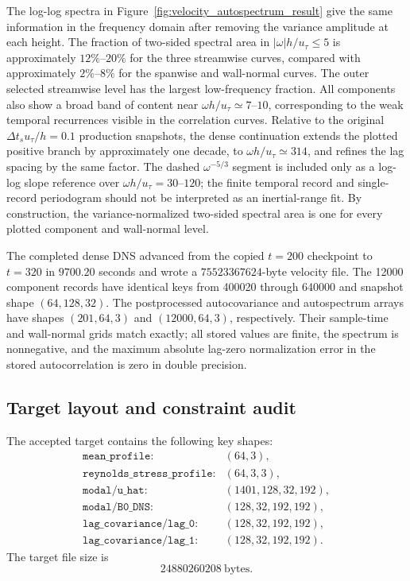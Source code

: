 \documentclass[11pt]{article}
\begin{document}
The log-log spectra in Figure~\ref{fig:velocity_autospectrum_result} give the
same information in the frequency domain after removing the variance amplitude
at each height. The fraction of two-sided spectral area in
\(|\omega|h/u_{\tau}\le5\) is approximately \(12\%\)--\(20\%\) for the three
streamwise curves, compared with approximately \(2\%\)--\(8\%\) for the
spanwise and wall-normal curves. The outer selected streamwise level has the
largest low-frequency fraction. All components also show a broad band of
content near \(\omega h/u_{\tau}\simeq7\)--\(10\), corresponding to the weak
temporal recurrences visible in the correlation curves. Relative to the
original \(\Delta t_s u_\tau/h=0.1\) production snapshots, the dense
continuation extends the plotted positive branch by approximately one decade,
to \(\omega h/u_\tau\simeq314\), and refines the lag spacing by the same
factor. The dashed \(\omega^{-5/3}\) segment is included only as a log-log
slope reference over \(\omega h/u_\tau=30\)--\(120\); the finite temporal
record and single-record periodogram should not be interpreted as an
inertial-range fit. By construction, the variance-normalized two-sided
spectral area is one for every plotted component and wall-normal level.

The completed dense DNS advanced from the copied \(t=200\) checkpoint to
\(t=320\) in \(9700.20\) seconds and wrote a
\(75523367624\)-byte velocity file. The 12000 component records have identical
keys from 400020 through 640000 and snapshot shape \((64,128,32)\). The
postprocessed autocovariance and autospectrum arrays have shapes
\((201,64,3)\) and \((12000,64,3)\), respectively. Their sample-time and
wall-normal grids match exactly; all stored values are finite, the spectrum is
nonnegative, and the maximum absolute lag-zero normalization error in the
stored autocorrelation is zero in double precision.

\subsection{Target layout and constraint audit}

The accepted target contains the following key shapes:
\[
\begin{array}{ll}
\texttt{mean\_profile}: & (64,3),\\
\texttt{reynolds\_stress\_profile}: & (64,3,3),\\
\texttt{modal/u\_hat}: & (1401,128,32,192),\\
\texttt{modal/B0\_DNS}: & (128,32,192,192),\\
\texttt{lag\_covariance/lag\_0}: & (128,32,192,192),\\
\texttt{lag\_covariance/lag\_1}: & (128,32,192,192).
\end{array}
\]
The target file size is
\[
  24880260208\ \text{bytes}.
\]
\end{document}
